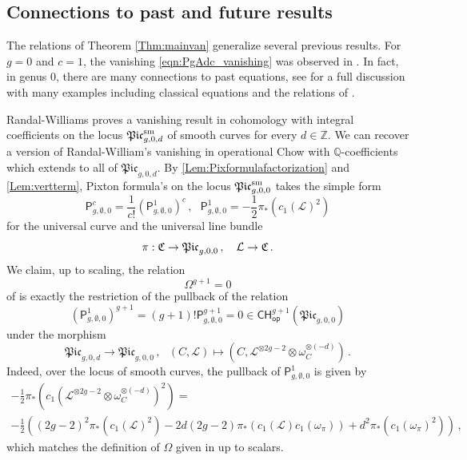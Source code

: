 \documentclass[a4paper,12pt]{article} %
\newcommand{\ca}[1]{{\mathcal{#1}}}
\def\P{\mathsf{P}}
\theoremstyle{definition}
\theoremstyle{plain}%
\newcommand{\Picabs}{\mathfrak{Pic}}
\begin{document}
\subsection{Connections to past and future results}\label{pasfut}
The relations of Theorem \ref{Thm:mainvan}
 generalize several previous results.
For $g=0$ and $c=1$, the vanishing \eqref{eqn:PgAdc_vanishing}
was observed in \cite[Proposition 1.2]{deJongStarr}. 
In fact, in genus $0$, there are many connections to past equations, see \cite[Section 4]{Bae}
for a full discussion with many examples including classical
equations and 
the relations of \cite{LeePand}.


Randal-Williams \cite{RandalWilliams2012}  proves
a vanishing result in  cohomology with integral coefficients on the locus $\Picabs_{g,0,d}^\textup{sm}$ of smooth curves
for every $d \in \mathbb{Z}$.
We can recover a version of Randal-William's
vanishing in operational Chow  with $\mathbb{Q}$-coefficients which extends to all of $\Picabs_{g,0,d}$.  By \cref{Lem:Pixformulafactorization} and \cref{Lem:vertterm},  Pixton formula's on the locus $\Picabs_{g,0,0}^\textup{sm}$ takes the simple form
\[\P_{g,\emptyset,0}^c = \frac{1}{c!} (\P_{g,\emptyset,0}^1)^c\, ,\ \ \  \P_{g,\emptyset,0}^1 = - \frac{1}{2} \pi_* (c_1(\ca L)^2)\]
for the universal curve and the universal line bundle
$$\pi: \frak C \to \Picabs_{g,0,0}\, , \ \ \ \ca L \to \frak C\, .$$
We claim, up to scaling, the relation 
$$\Omega^{g+1}=0$$ of
\cite[Theorem A]{RandalWilliams2012} is exactly the restriction of the pullback of the relation $$(\P_{g,\emptyset,0}^1)^{g+1} = (g+1)! \P_{g,\emptyset,0}^{g+1} = 0 
\in {\mathsf{CH}}^{g+1}_{\mathsf{op}}(\Picabs_{g,0,0})$$
under the morphism
\[\Picabs_{g,0,d} \to \Picabs_{g,0,0}\, ,\ \ \ (C, \ca L) \mapsto (C, \ca L^{\otimes 2g-2} \otimes \omega_C^{\otimes (-d)})\, .\]
Indeed, over the locus of smooth curves, the pullback of $\P_{g,\emptyset,0}^1$ is given by
\begin{multline*} 
- \frac{1}{2} \pi_* (c_1(\ca L^{\otimes 2g-2} \otimes \omega_C^{\otimes (-d)})^2)=\\ -\frac{1}{2} \left((2g-2)^2 \pi_*(c_1(\ca L)^2) - 2d(2g-2)\pi_*(c_1(\ca L ) c_1(\omega_\pi)) + d^2 \pi_*(c_1(\omega_\pi)^2) \right)\, ,\end{multline*}
which matches the definition of $\Omega$ given in \cite[Theorem A]{RandalWilliams2012}
up to scalars.
\end{document}
